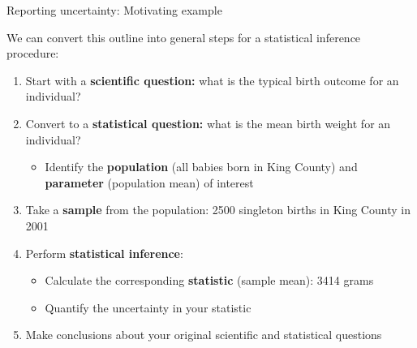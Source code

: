 \documentclass[10pt,t]{beamer}
\begin{document}
\begin{frame}{Reporting uncertainty: Motivating example}
	
\vspace{-3 mm}
	
We can convert this outline into general steps for a statistical inference procedure:

\vspace{0.3cm}

\begin{enumerate}
	\item Start with a \textbf{scientific question:} what is the typical birth outcome for an individual?
	\item Convert to a \textbf{statistical question:} what is the mean birth weight for an individual?
	\begin{itemize}
		\item Identify the \textbf{population} (all babies born in King County) and \textbf{parameter} (population mean) of interest
	\end{itemize}
	\item Take a \textbf{sample} from the population: 2500 singleton births in King County in 2001
	\item Perform \textbf{statistical inference}:
	\begin{itemize}
		\item Calculate the corresponding \textbf{statistic} (sample mean): 3414 grams
		\item Quantify the uncertainty in your statistic
	\end{itemize}
	\item Make conclusions about your original scientific and statistical questions
\end{enumerate}
\end{frame}
\end{document}

